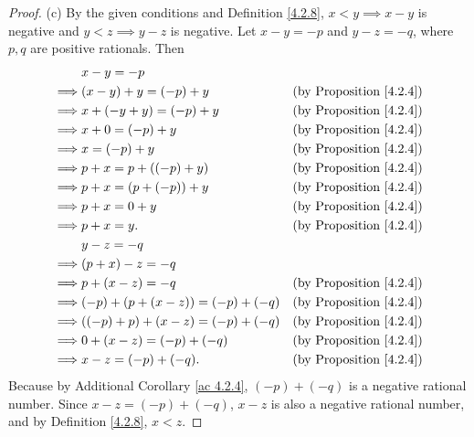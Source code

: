 \begin{proof}{(c)}
    By the given conditions and Definition \ref{4.2.8}, \(x < y \implies x - y\) is negative and \(y < z \implies y - z\) is negative.
    Let \(x - y = -p\) and \(y - z = -q\), where \(p, q\) are positive rationals.
    Then
    \begin{align*}
                 & x - y = -p                                                               \\
        \implies & (x - y) + y = (-p) + y             & \text{(by Proposition \ref{4.2.4})} \\
        \implies & x + (-y + y) = (-p) + y            & \text{(by Proposition \ref{4.2.4})} \\
        \implies & x + 0 = (-p) + y                   & \text{(by Proposition \ref{4.2.4})} \\
        \implies & x = (-p) + y                       & \text{(by Proposition \ref{4.2.4})} \\
        \implies & p + x = p + ((-p) + y)             & \text{(by Proposition \ref{4.2.4})} \\
        \implies & p + x = (p + (-p)) + y             & \text{(by Proposition \ref{4.2.4})} \\
        \implies & p + x = 0 + y                      & \text{(by Proposition \ref{4.2.4})} \\
        \implies & p + x = y.                         & \text{(by Proposition \ref{4.2.4})} \\
                 & y - z = -q                                                               \\
        \implies & (p + x) - z = -q                                                         \\
        \implies & p + (x - z) = -q                   & \text{(by Proposition \ref{4.2.4})} \\
        \implies & (-p) + (p + (x - z)) = (-p) + (-q) & \text{(by Proposition \ref{4.2.4})} \\
        \implies & ((-p) + p) + (x - z) = (-p) + (-q) & \text{(by Proposition \ref{4.2.4})} \\
        \implies & 0 + (x - z) = (-p) + (-q)          & \text{(by Proposition \ref{4.2.4})} \\
        \implies & x - z = (-p) + (-q).               & \text{(by Proposition \ref{4.2.4})} \\
    \end{align*}
    Because by Additional Corollary \ref{ac 4.2.4}, \((-p) + (-q)\) is a negative rational number.
    Since \(x - z = (-p) + (-q)\), \(x - z\) is also a negative rational number, and by Definition \ref{4.2.8}, \(x < z\).
\end{proof}

